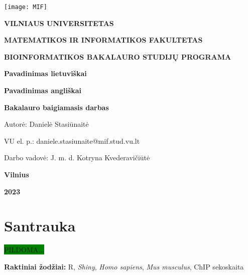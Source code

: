 \documentclass[12pt]{article}
\begin{document}

\begin{titlepage}
\vskip 20pt
\begin{center}
\texttt{[image: MIF]}
\end{center}


\vskip 20pt
\centerline{\bf \large \textbf{VILNIAUS UNIVERSITETAS}}
\bigskip
\centerline{\large \textbf{MATEMATIKOS IR INFORMATIKOS FAKULTETAS}}
\bigskip
\centerline{\large \textbf{BIOINFORMATIKOS BAKALAURO STUDIJŲ PROGRAMA}}

\vskip 90pt
\begin{center}
    {\bf \LARGE Pavadinimas lietuviškai}
\end{center}
\begin{center}
    {\bf \Large Pavadinimas angliškai}
\end{center}
\vskip 20pt
\centerline{\bf \large \textbf{Bakalauro baigiamasis darbas}}
\bigskip
\vskip 40pt

\hskip 140pt {\large Autorė: Danielė Stasiūnaitė}

\hskip 140pt{\large VU el. p.: daniele.stasiunaite@mif.stud.vu.lt}
\bigskip
\vskip 20pt

\hskip 140pt {\large Darbo vadovė: J. m. d. Kotryna Kvederavičiūtė}
\vskip 60pt
\vskip 40pt
\centerline{\large \textbf{Vilnius}}
\centerline{\large \textbf{2023}}
\newpage
\end{titlepage}



\tableofcontents
\newpage


\section*{Santrauka}
\colorbox{green}{PILDOMA...}

\hfill \break
\textbf{Raktiniai žodžiai:} R, \emph{Shiny}, \emph{Homo sapiens},
\emph{Mus musculus}, ChIP sekoskaita

\newpage

\end{document}
